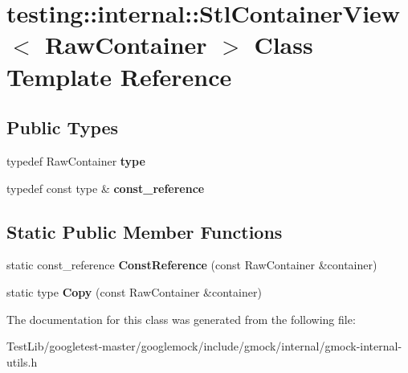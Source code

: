 \hypertarget{classtesting_1_1internal_1_1StlContainerView}{}\section{testing\+:\+:internal\+:\+:Stl\+Container\+View$<$ Raw\+Container $>$ Class Template Reference}
\label{classtesting_1_1internal_1_1StlContainerView}
\subsection*{Public Types}
\begin{DoxyCompactItemize}
\item 
\mbox{\label{classtesting_1_1internal_1_1StlContainerView_a2b2c63a6dcdbfe63fb0ee121ebf463ba}} 
typedef Raw\+Container {\bfseries type}
\item 
\mbox{\label{classtesting_1_1internal_1_1StlContainerView_a9cd4f6ed689b3938cdb7b3c4cbf1b36b}} 
typedef const type \& {\bfseries const\+\_\+reference}
\end{DoxyCompactItemize}
\subsection*{Static Public Member Functions}
\begin{DoxyCompactItemize}
\item 
\mbox{\label{classtesting_1_1internal_1_1StlContainerView_a36eccf53329730f6e55c12002128bf25}} 
static const\+\_\+reference {\bfseries Const\+Reference} (const Raw\+Container \&container)
\item 
\mbox{\label{classtesting_1_1internal_1_1StlContainerView_a441123838221f1284873f66ed968f279}} 
static type {\bfseries Copy} (const Raw\+Container \&container)
\end{DoxyCompactItemize}


The documentation for this class was generated from the following file\+:\begin{DoxyCompactItemize}
\item 
Test\+Lib/googletest-\/master/googlemock/include/gmock/internal/gmock-\/internal-\/utils.\+h\end{DoxyCompactItemize}
